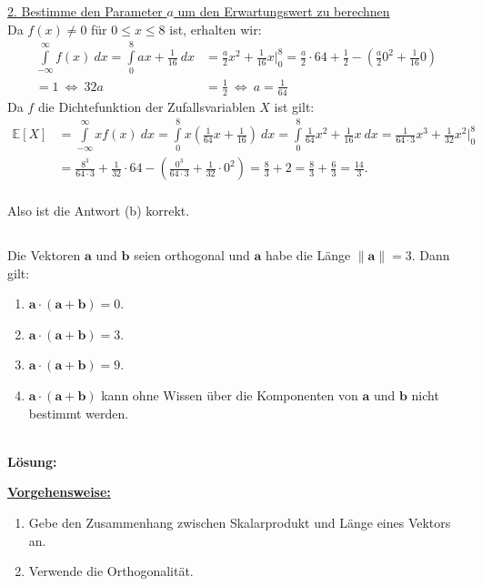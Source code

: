 \underline{2. Bestimme den Parameter $ a $ um den Erwartungswert zu berechnen}\\
Da $ f(x)  \neq 0$ für $ 0 \leq x \leq 8 $ ist, erhalten wir:
\begin{align*}
\int \limits_{- \infty}^\infty f(x) \ dx
= 
\int \limits_0^8 ax + \frac{1}{16} \ dx
&=
\frac{a}{2}x^2 + \frac{1}{16}x \bigg|_0^8
=
\frac{a}{2} \cdot 64 + \frac{1}{2}
- \left( \frac{a}{2}0^2 + \frac{1}{16}0 \right)\\
 = 1 
\ \Leftrightarrow \
32 a &= \frac{1}{2}
\ \Leftrightarrow \ 
a = \frac{1}{64}
\end{align*}
Da $ f $ die Dichtefunktion der Zufallsvariablen $ X $ ist gilt:
\begin{align*}
\mathbb{E}[X]
&=
\int \limits_{- \infty}^\infty x f(x) \ dx
=
\int \limits_{0}^8
x \left(\frac{1}{64}x  + \frac{1}{16}\right) \ dx
= 
\int \limits_{0}^8 
\frac{1}{64}x^2 + \frac{1}{16} x \ dx
= 
\frac{1}{64 \cdot 3}x^3 + \frac{1}{32} x^2 \bigg|_0^8\\
&= 
\frac{8^3}{64 \cdot 3}  + \frac{1}{32} \cdot 64 - \left( \frac{0^3}{64 \cdot 3}  + \frac{1}{32} \cdot 0^2 \right)
=
\frac{8}{ 3}  + 2
=
\frac{ 8 }{3}  + \frac{6}{3}
=
\frac{ 14}{3}. 
\end{align*}
\ \\
Also ist die Antwort (b) korrekt.

\newpage
\subsection*{}
Die Vektoren $ \textbf{a} $ und $ \textbf{b} $ seien orthogonal und $ \textbf{a}  $ habe die Länge $ \| \textbf{a} \| = 3 $.
Dann gilt:
\renewcommand{\labelenumi}{(\alph{enumi})}
\begin{enumerate}
	\item 
	$ \textbf{a} \cdot ( \textbf{a} + \textbf{b}) = 0 $.
	\item
	$ \textbf{a} \cdot ( \textbf{a} + \textbf{b}) = 3 $.
	
	\item
	$ \textbf{a} \cdot ( \textbf{a} + \textbf{b}) = 9 $.
	\item
	$ \textbf{a} \cdot ( \textbf{a} + \textbf{b}) $ kann ohne Wissen über die Komponenten von $ \textbf{a} $ und $ \textbf{b} $ nicht bestimmt werden.
\end{enumerate}
\ \\
\textbf{Lösung:}
\begin{mdframed}
	\underline{\textbf{Vorgehensweise:}}
	\renewcommand{\labelenumi}{\theenumi.}
	\begin{enumerate}
		\item Gebe den Zusammenhang zwischen Skalarprodukt und Länge eines Vektors an.
		\item Verwende die Orthogonalität.
	\end{enumerate}
\end{mdframed}

